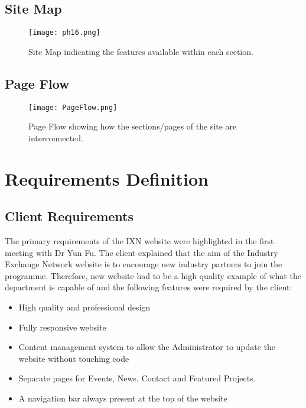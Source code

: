 \documentclass[fontsize=11pt]{extarticle}
\numberwithin{figure}{section} %
\numberwithin{table}{section}%
\providecommand{\tightlist}{%
  \setlength{\itemsep}{0pt}\setlength{\parskip}{0pt}}
\begin{document}
\hypertarget{site-map}{%
\subsection{Site Map}\label{site-map}}

\begin{figure}[H]
      \centering
      \texttt{[image: ph16.png]}
      \caption{Site Map indicating the features available within each section.}
      \label{sitemap}
 \end{figure}

\hypertarget{page-flow}{%
\subsection{Page Flow}\label{page-flow}}

\begin{figure}[H]
      \centering
      \texttt{[image: PageFlow.png]}
      \caption{Page Flow showing how the sections/pages of the site are interconnected. }
      \label{pageflow}
 \end{figure}

\newpage

\hypertarget{requirements-definition}{%
\section{Requirements Definition}\label{requirements-definition}}

\hypertarget{client-requirements}{%
\subsection{Client Requirements}\label{client-requirements}}

The primary requirements of the IXN website were highlighted in the
first meeting with Dr Yun Fu. The client explained that the aim of the
Industry Exchange Network website is to encourage new industry partners
to join the programme. Therefore, new website had to be a high quality
example of what the department is capable of and the following features
were required by the client:

\begin{itemize}
\tightlist
\item
  High quality and professional design
\item
  Fully responsive website
\item
  Content management system to allow the Administrator to update the
  website without touching code
\item
  Separate pages for Events, News, Contact and Featured Projects.
\item
  A navigation bar always present at the top of the website
\end{itemize}
\end{document}
